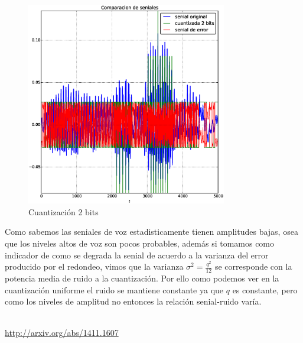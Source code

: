 \documentclass[10pt]{article}
\begin{document}
\begin{itemize}
\begin{figure}[H]
   \centering
   \includegraphics[width=0.78\textwidth]{./Images/senialesv_voz_2_bits.eps}
   \caption{Cuantización 2 bits}\label{fig:qv:2}     
\end{figure}

Como sabemos las seniales de voz estadisticamente tienen amplitudes bajas, osea que
los niveles altos de voz son pocos probables, además si tomamos como indicador de como se
degrada la senial de acuerdo a la varianza del error producido por el redondeo, vimos que
la varianza $\sigma^{2}=\frac{q^{2}}{12}$ se corresponde con la potencia media de ruido 
a la cuantización. Por ello como podemos ver en la cuantización uniforme el ruido se mantiene constante
ya que $q$ es constante, pero como los niveles de amplitud no entonces la relación senial-ruido varía. 

\end{itemize}
\begin{thebibliography}{6}
 \\
 \url{http://arxiv.org/abs/1411.1607}
\end{thebibliography}
\end{document}
